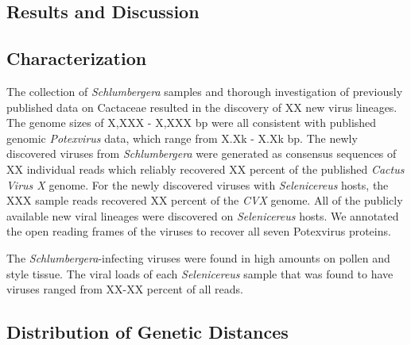 \documentclass[11pt,letterpaper,titlepage]{article}
\begin{document}
\begin{linenumbers}
\section*{Results and Discussion}
\subsection*{Characterization}
The collection of \textit{Schlumbergera} samples and thorough investigation of previously published data on Cactaceae resulted in the discovery of XX new virus lineages.
The genome sizes of X,XXX - X,XXX bp were all consistent with published genomic \textit{Potexvirus} data, which range from X.Xk - X.Xk bp.
The newly discovered viruses from \textit{Schlumbergera} were generated as consensus sequences of XX individual reads which reliably recovered XX percent of the published\textit{ Cactus Virus X} genome. 
For the newly discovered viruses with \textit{Selenicereus} hosts, the XXX sample reads recovered XX percent of the \textit{CVX} genome.
All of the publicly available new viral lineages were discovered on \textit{Selenicereus} hosts.
We annotated the open reading frames of the viruses to recover all seven Potexvirus proteins.

The \textit{Schlumbergera}-infecting viruses were found in high amounts on pollen and style tissue.
The viral loads of each \textit{Selenicereus} sample that was found to have viruses ranged from XX-XX percent of all reads.

\subsection*{Distribution of Genetic Distances}


\end{linenumbers}
\end{document}
